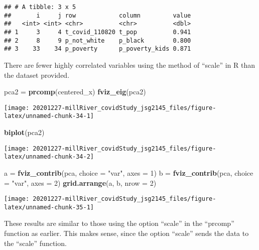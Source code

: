 \documentclass[
]{article}
\newenvironment{Shaded}{\begin{snugshade}}{\end{snugshade}}
\newcommand{\DataTypeTok}[1]{\textcolor[rgb]{0.13,0.29,0.53}{#1}}
\newcommand{\DecValTok}[1]{\textcolor[rgb]{0.00,0.00,0.81}{#1}}
\newcommand{\KeywordTok}[1]{\textcolor[rgb]{0.13,0.29,0.53}{\textbf{#1}}}
\newcommand{\NormalTok}[1]{#1}
\newcommand{\StringTok}[1]{\textcolor[rgb]{0.31,0.60,0.02}{#1}}
\begin{document}
\begin{verbatim}
## # A tibble: 3 x 5
##       i     j row            column         value
##   <int> <int> <chr>          <chr>          <dbl>
## 1     3     4 t_covid_110820 t_pop          0.941
## 2     8     9 p_not_white    p_black        0.800
## 3    33    34 p_poverty      p_poverty_kids 0.871
\end{verbatim}

There are fewer highly correlated variables using the method of
``scale'' in R than the dataset provided.

\begin{Shaded}
\begin{Highlighting}[]
\NormalTok{pca2 =}\StringTok{ }\KeywordTok{prcomp}\NormalTok{(centered_x)}
\KeywordTok{fviz_eig}\NormalTok{(pca2)}
\end{Highlighting}
\end{Shaded}

\texttt{[image: 20201227-millRiver\_covidStudy\_jsg2145\_files/figure-latex/unnamed-chunk-34-1]}

\begin{Shaded}
\begin{Highlighting}[]
\KeywordTok{biplot}\NormalTok{(pca2)}
\end{Highlighting}
\end{Shaded}

\texttt{[image: 20201227-millRiver\_covidStudy\_jsg2145\_files/figure-latex/unnamed-chunk-34-2]}

\begin{Shaded}
\begin{Highlighting}[]
\NormalTok{a =}\StringTok{ }\KeywordTok{fviz_contrib}\NormalTok{(pca, }\DataTypeTok{choice =} \StringTok{"var"}\NormalTok{, }\DataTypeTok{axes =} \DecValTok{1}\NormalTok{) }
\NormalTok{b =}\StringTok{ }\KeywordTok{fviz_contrib}\NormalTok{(pca, }\DataTypeTok{choice =} \StringTok{"var"}\NormalTok{, }\DataTypeTok{axes =} \DecValTok{2}\NormalTok{) }
\KeywordTok{grid.arrange}\NormalTok{(a, b, }\DataTypeTok{nrow =} \DecValTok{2}\NormalTok{)}
\end{Highlighting}
\end{Shaded}

\texttt{[image: 20201227-millRiver\_covidStudy\_jsg2145\_files/figure-latex/unnamed-chunk-35-1]}

These results are similar to those using the option ``scale'' in the
``prcomp'' function as earlier. This makes sense, since the option
``scale'' sends the data to the ``scale'' function.
\end{document}
